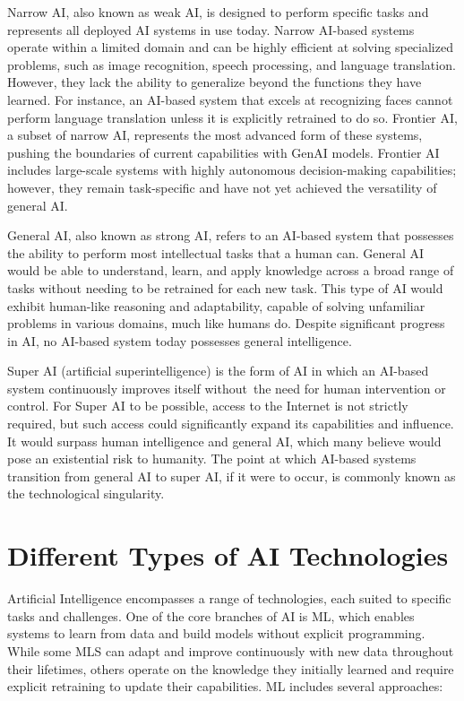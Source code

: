 \documentclass[
  letterpaper,
  DIV=11,
  numbers=noendperiod,
  oneside]{scrreprt}
\begin{document}
\begin{tcolorbox}
Narrow AI{}, also known as weak AI, is designed to perform specific
tasks and represents all deployed AI systems in use today. Narrow
AI-based systems operate within a limited domain and can be highly
efficient at solving specialized problems, such as image recognition,
speech processing, and language translation. However, they lack the
ability to generalize beyond the functions they have learned. For
instance, an AI-based system that excels at recognizing faces cannot
perform language translation unless it is explicitly retrained to do so.
Frontier AI{}, a subset of narrow AI, represents the most advanced form
of these systems, pushing the boundaries of current capabilities with
GenAI models. Frontier AI includes large-scale systems with highly
autonomous decision-making capabilities; however, they remain
task-specific and have not yet achieved the versatility of general AI.

General AI{}, also known as strong AI, refers to an AI-based system that
possesses the ability to perform most intellectual tasks that a human
can. General AI would be able to understand, learn, and apply knowledge
across a broad range of tasks without needing to be retrained for each
new task. This type of AI would exhibit human-like reasoning and
adaptability, capable of solving unfamiliar problems in various domains,
much like humans do. Despite significant progress in AI, no AI-based
system today possesses general intelligence.

Super AI{} (artificial superintelligence) is the form of AI in which an
AI-based system continuously improves itself without~the need for human
intervention or control. For Super AI to be possible, access to the
Internet is not strictly required, but such access could significantly
expand its capabilities and influence. It would surpass human
intelligence and general AI, which many believe would pose an
existential risk to humanity. The point at which AI-based systems
transition from general AI to super AI, if it were to occur, is commonly
known as the technological singularity.

\section{Different Types of AI
Technologies}\label{different-types-of-ai-technologies}

Artificial Intelligence encompasses a range of technologies, each suited
to specific tasks and challenges. One of the core branches of AI is
ML{}, which enables systems to learn from data and build models without
explicit programming. While some MLS can adapt and improve continuously
with new data throughout their lifetimes, others operate on the
knowledge they initially learned and require explicit retraining to
update their capabilities. ML includes several approaches:


\end{tcolorbox}
\end{document}
